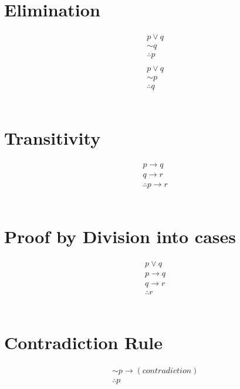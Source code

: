 \documentclass{article}
\begin{document}
\section{Elimination}
\begin{align*}
& p \lor q \\ 
& \sim q \\
& \therefore p \\ \\
& p \lor q \\ 
& \sim p \\
& \therefore q
\end{align*} \\

\section{Transitivity}
\begin{align*}
& p \rightarrow q \\ 
& q \rightarrow r \\
& \therefore p \rightarrow r
\end{align*} \\

\section{Proof by Division into cases}
\begin{align*}
& p \lor q \\ 
& p \rightarrow q \\
& q \rightarrow r \\
& \therefore r
\end{align*} \\

\section{Contradiction Rule}
\begin{align*}
& \sim p \rightarrow (contradiction) \\
& \therefore p
\end{align*} \\
\end{document}
